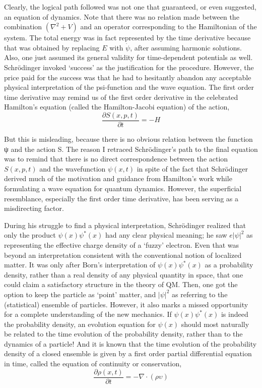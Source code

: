 Clearly, the logical path followed was not one that guaranteed, or even suggested, an
equation of dynamics. Note that there was no relation made between the combination
$(\nabla^2 + V )$ and an operator corresponding to the Hamiltonian of the system. The total energy
was in fact represented by the time derivative because that was obtained by replacing $E$
with $\dot{\psi}$, after assuming harmonic solutions. Also, one just assumed its general validity for
time-dependent potentials as well. Schr\"{o}dinger invoked `success' as the justification for the
procedure. However, the price paid for the success was that he had to hesitantly abandon
any acceptable physical interpretation of the psi-function and the wave equation. The first
order time derivative may remind us of the first order derivative in the celebrated Hamilton's
equation (called the Hamilton-Jacobi equation) of the action,
\begin{equation*}
\frac{\partial S (x,p,t)}{\partial t} = - H \tag{7}
\end{equation*}

But this is misleading, because there is no obvious relation between the function ψ and the
action S. The reason I retraced Schr\"{o}dinger's path to the final equation was to remind
that there is no direct correspondence between the action $S(x, p, t)$ and the wavefunction
$\psi(x, t)$ in spite of the fact that Schr\"{o}dinger derived much of the motivation and guidance
from Hamilton's work while formulating a wave equation for quantum dynamics. However,
the superficial resemblance, especially the first order time derivative, has been serving as a
misdirecting factor.

During his struggle to find a physical interpretation, Schr\"{o}dinger realized that only the
product $\psi(x) \psi^{\ast}(x)$ had any clear physical meaning; he saw $e|\psi|^2$ as representing the effective
charge density of a `fuzzy' electron. Even that was beyond an interpretation consistent
with the conventional notion of localized matter. It was only after Born's interpretation of
$\psi(x)\psi^{\ast} (x)$ as a probability density, rather than a real density of any physical quantity in
space, that one could claim a satisfactory structure in the theory of QM. Then, one got the
option to keep the particle as `point' matter, and $|\psi|^2$ as referring to the (statistical) ensemble
of particles. However, it also marks a missed opportunity for a complete understanding of
the new mechanics. If $\psi(x) \psi^{\ast} (x)$ is indeed the probability density, an evolution equation
for $\psi(x)$ should most naturally be related to the time evolution of the probability density,
rather than to the dynamics of a particle! And it is known that the time evolution of the
probability density of a closed ensemble is given by a first order partial differential equation
in time, called the equation of continuity or conservation,
\begin{equation*}
\frac{\partial \rho (x,t)}{\partial t} = - \nabla \cdot (\rho \upsilon) \tag{8}
\end{equation*}

